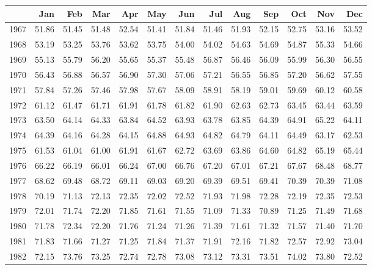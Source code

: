 \begin{longtable}{rrrrrrrrrrrrr}
  \hline
 & Jan & Feb & Mar & Apr & May & Jun & Jul & Aug & Sep & Oct & Nov & Dec \\ 
  \hline
1967 & 51.86 & 51.45 & 51.48 & 52.54 & 51.41 & 51.84 & 51.46 & 51.93 & 52.15 & 52.75 & 53.16 & 53.52 \\ 
  1968 & 53.19 & 53.25 & 53.76 & 53.62 & 53.75 & 54.00 & 54.02 & 54.63 & 54.69 & 54.87 & 55.33 & 54.66 \\ 
  1969 & 55.13 & 55.79 & 56.20 & 55.65 & 55.37 & 55.48 & 56.87 & 56.46 & 56.09 & 55.99 & 56.30 & 56.55 \\ 
  1970 & 56.43 & 56.88 & 56.57 & 56.90 & 57.30 & 57.06 & 57.21 & 56.55 & 56.85 & 57.20 & 56.62 & 57.55 \\ 
  1971 & 57.84 & 57.26 & 57.46 & 57.98 & 57.67 & 58.09 & 58.91 & 58.19 & 59.01 & 59.69 & 60.12 & 60.58 \\ 
  1972 & 61.12 & 61.47 & 61.71 & 61.91 & 61.78 & 61.82 & 61.90 & 62.63 & 62.73 & 63.45 & 63.44 & 63.59 \\ 
  1973 & 63.50 & 64.14 & 64.33 & 63.84 & 64.52 & 63.93 & 63.78 & 63.85 & 64.39 & 64.91 & 65.22 & 64.11 \\ 
  1974 & 64.39 & 64.16 & 64.28 & 64.15 & 64.88 & 64.93 & 64.82 & 64.79 & 64.11 & 64.49 & 63.17 & 62.53 \\ 
  1975 & 61.53 & 61.04 & 61.00 & 61.91 & 61.67 & 62.72 & 63.69 & 63.86 & 64.60 & 64.82 & 65.19 & 65.44 \\ 
  1976 & 66.22 & 66.19 & 66.01 & 66.24 & 67.00 & 66.76 & 67.20 & 67.01 & 67.21 & 67.67 & 68.48 & 68.77 \\ 
  1977 & 68.62 & 69.48 & 68.72 & 69.11 & 69.03 & 69.20 & 69.39 & 69.51 & 69.41 & 70.39 & 70.39 & 71.08 \\ 
  1978 & 70.19 & 71.13 & 72.13 & 72.35 & 72.02 & 72.52 & 71.93 & 71.98 & 72.28 & 72.19 & 72.35 & 72.53 \\ 
  1979 & 72.01 & 71.74 & 72.20 & 71.85 & 71.61 & 71.55 & 71.09 & 71.33 & 70.89 & 71.25 & 71.49 & 71.68 \\ 
  1980 & 71.78 & 72.34 & 72.20 & 71.76 & 71.24 & 71.26 & 71.39 & 71.61 & 71.32 & 71.57 & 71.40 & 71.70 \\ 
  1981 & 71.83 & 71.66 & 71.27 & 71.25 & 71.84 & 71.37 & 71.91 & 72.16 & 71.82 & 72.57 & 72.92 & 73.04 \\ 
  1982 & 72.15 & 73.76 & 73.25 & 72.74 & 72.78 & 73.08 & 73.12 & 73.31 & 73.51 & 74.02 & 73.80 & 72.52 \\ 

\end{longtable}
